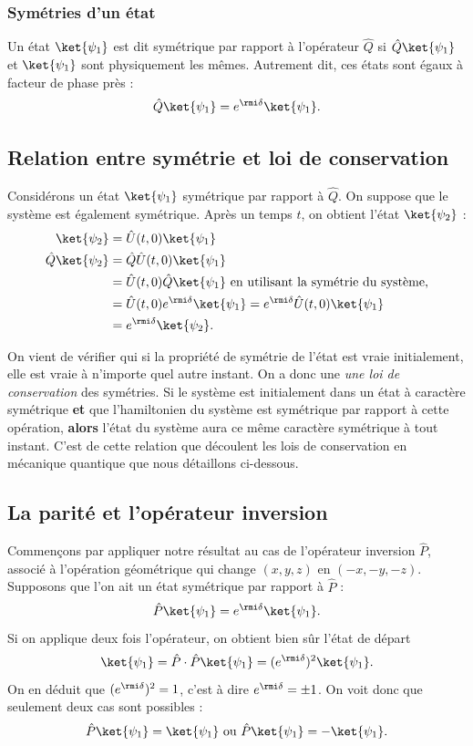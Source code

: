 \subsubsection{Symétries d'un état}
Un état $\ket{\psi_1}$ est dit symétrique par rapport à l'opérateur $\hat{Q}$ si $\hat{Q}\ket{\psi_1}$ et $\ket{\psi_1}$ sont physiquement les mêmes. Autrement dit, ces états sont égaux à facteur de phase près :
\[\hat{Q}\ket{\psi_1} = e^{\rmi\delta}\ket{\psi_1}.\]

\subsection{Relation entre symétrie et loi de conservation}
Considérons un état $\ket{\psi_1}$ symétrique par rapport à $\hat{Q}$. On suppose que le système est également symétrique. Après un temps $t$, on obtient l'état $\ket{\psi_2}$ :
\begin{align*}
\ket{\psi_2}&=\hat{U}(t,0)\ket{\psi_1}\\
\hat{Q}\ket{\psi_2}&=\hat{Q}\hat{U}(t,0)\ket{\psi_1}\\
&=\hat{U}(t,0)\hat{Q}\ket{\psi_1} \mbox{ en utilisant la symétrie du système,}\\
&=\hat{U}(t,0)e^{\rmi\delta}\ket{\psi_1}=e^{\rmi\delta}\hat{U}(t,0)\ket{\psi_1}\\
&=e^{\rmi\delta}\ket{\psi_2}.
\end{align*}

On vient de vérifier qui si la propriété de symétrie de l'état est vraie initialement, elle est vraie à n'importe quel autre instant. On a donc une \textit{une loi de conservation} des symétries. Si le système est initialement dans un état à caractère symétrique \textbf{et} que l'hamiltonien du système est symétrique par rapport à cette opération, \textbf{alors} l'état du système aura ce même caractère symétrique à tout instant. C'est de cette relation que découlent les lois de conservation en mécanique quantique que nous détaillons ci-dessous.

\subsection{La parité et l'opérateur inversion}
Commençons par appliquer notre résultat au cas de l'opérateur inversion $\hat{P}$, associé à l'opération géométrique qui change $(x,y,z)$ en $(-x,-y,-z)$. Supposons que l'on ait un état symétrique par rapport à $\hat{P}$ : 
\begin{equation*}
\hat{P}\ket{\psi_1} = e^{\rmi\delta}\ket{\psi_1}.
\end{equation*}
Si on applique deux fois l'opérateur, on obtient bien sûr l'état de départ
\begin{equation*}
\ket{\psi_1} = \hat{P}\cdot\hat{P}\ket{\psi_1} = (e^{\rmi\delta})^2\ket{\psi_1}.
\end{equation*}
On en déduit que $(e^{\rmi\delta})^2=1$, c'est à dire $e^{\rmi\delta}=\pm1$. On voit donc que seulement deux cas sont possibles :
\begin{equation*}
\hat{P}\ket{\psi_1} = \ket{\psi_1} \mbox{ ou } \hat{P}\ket{\psi_1} = -\ket{\psi_1}.
\end{equation*}

